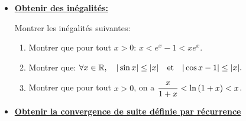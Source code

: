 \documentclass[a4paper, 11pt]{article}
\begin{document}
\begin{itemize}
	\item[{\large\ding{182}}] \underline{{\large\textbf{Obtenir des in\'egalit\'es:}}}\\


	      \setlength\fboxrule{1pt}
	      \setlength\fboxrule{0.5pt}\vsec

	      {\footnotesize
		      \begin{exercice} Montrer les in\'egalit\'es suivantes:
			      \begin{enumerate}
				      \item Montrer que pour tout $x>0$: $x<e^x-1<xe^x$.
				      \item Montrer que: $\forall x\in\mathbb{R}, \quad |\sin{x}|\leq |x| \quad \hbox{et} \quad |\cos{x}-1|\leq |x|.$
				      \item Montrer que pour tout $x>0$, on a $\displaystyle\frac{x}{1+x}<\ln{(1+x)}<x$.
			      \end{enumerate}
		      \end{exercice}}
	      \vsec

	\item[{\large{\ding{183}}}]  \underline{{\large\textbf{Obtenir la convergence de suite d\'efinie par r\'ecurrence}}}\\



\end{itemize}
\end{document}
